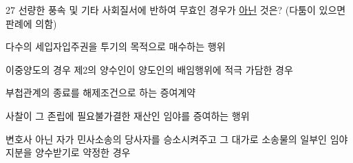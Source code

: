 \begin{question}{27}
선량한 풍속 및 기타 사회질서에 반하여 무효인 경우가 \uline{아닌} 것은? (다툼이 있으면 판례에 의함)
\begin{choices}
  \item 다수의 세입자입주권을 투기의 목적으로 매수하는 행위
  \item 이중양도의 경우 제2의 양수인이 양도인의 배임행위에 적극 가담한 경우
  \item 부첩관계의 종료를 해제조건으로 하는 증여계약
  \item 사찰이 그 존립에 필요불가결한 재산인 임야를 증여하는 행위
  \item 변호사 아닌 자가 민사소송의 당사자를 승소시켜주고 그 대가로 소송물의 일부인 임야지분을 양수받기로 약정한 경우
\end{choices}
\end{question}
